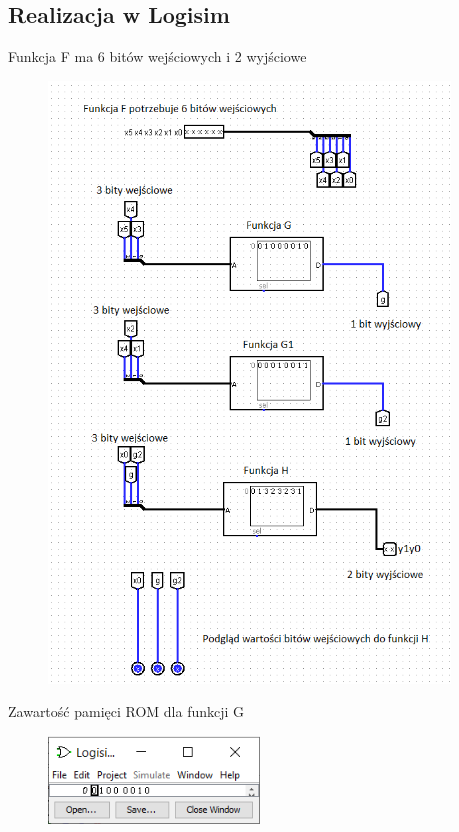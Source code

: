\documentclass[]{article}
\begin{document}
\subsection{Realizacja w Logisim}
Funkcja F ma 6 bitów wejściowych i 2 wyjściowe
\begin{figure}[H]
	\centering
	\includegraphics[width=0.95\textwidth]{logisim_all_3.png}
\end{figure}
Zawartość pamięci ROM dla funkcji G
\begin{figure}[H]
	\centering
	\includegraphics[width=0.5\textwidth]{romG.png}
\end{figure}
\end{document}
